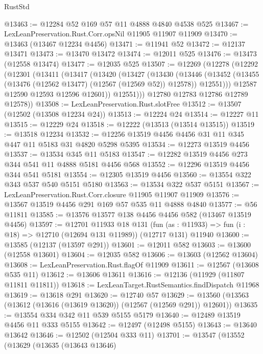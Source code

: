 \begin{lexlean}{RustStd}
\begin{coremodule}
@13463 := @12284 @52 @169 @57 @11 @4888 @4840 @4538 @525
@13467 := LexLeanPreservation.Rust.Corr.opsNil @11905 @11907 @11909
@13470 := @13463 (@13467 @12234 @4456)
@13471 := @11941 @52
@13472 := @12137 @13471
@13473 := @13470 @13472
@13474 := @12011 @525
@13476 := @13473 (@12558 @13474)
@13477 := @12035 @525
@13507 := @12269
    (@12278
      (@12292
        (@12301
          (@13411
            (@13417
              (@13420
                (@13427
                  (@13430
                    (@13446
                      (@13452
                        (@13455 (@13476 (@12562 @13477) (@12567 (@12569 @52)) @12578))
                        @12551)))
                  @12587
                  @12590
                  @12593
                  @12596
                  @12601))
              @12551)))
        @12780
        @12783
        @12786
        @12789
        @12578))
@13508 := LexLeanPreservation.Rust.slotFree
@13512 := @13507 (@12502 (@13508 @12234 @24))
@13513 := @12224 @24
@13514 := @12227 @11
@13515 := @12229 @24
@13518 := @12222 (@13513 (@13514 @13515))
@13519 := @13518 @12234
@13532 := @12256 @13519 @4456 @4456 @31 @11 @345 @447 @11 @5183 @31 @4820 @5298 @5395
@13534 := @12273 @13519 @4456
@13537 := @13534 @345 @11 @5183
@13547 := @12282 @13519 @4456 @273 @344 @541 @11 @4888 @5181 @4456 @568
@13552 := @12296 @13519 @4456 @344 @541 @5181
@13554 := @12305 @13519 @4456
@13560 := @13554 @322 @343 @537 @540 @5151 @5180
@13563 := @13534 @322 @537 @5151
@13567 := LexLeanPreservation.Rust.Corr.closure @11905 @11907 @11909
@13576 := @13567 @13519 @4456 @291 @169 @57 @535 @11 @4888 @4840
@13577 := @56 @11811
@13585 := @13576 @13577 @138 @4456 @4456 @582 (@13467 @13519 @4456)
@13597 := @12701
    @11933
    @18
    @131
    (fun (as : @11933) => fun (i : @18) => @12710 (@12694 @131 @11989))
    (@12717 @131)
    @11940
@13600 := @13585 (@12137 (@13597 @291))
@13601 := @12011 @582
@13603 := @13600 (@12558 @13601)
@13604 := @12035 @582
@13606 := @13603 (@12562 @13604)
@13608 := LexLeanPreservation.Rust.flagOf @11909
@13611 := @12567 (@13608 @535 @11)
@13612 := @13606 @13611
@13616 := @12136 (@11929 (@11807 @11811 @11811))
@13618 := LexLeanTarget.RustSemantics.findDispatch @11968
@13619 := @13618 @291
@13620 := @12740 @57
@13629 := @13560 (@13563 (@13612 (@13616 (@13619 @13620)) (@12567 (@12569 @291)) @12601))
@13635 := @13554 @334 @342 @11 @539 @5155 @5179
@13640 := @12489 @13519 @4456 @11 @333 @5155
@13642 := @12497 (@12498 @5155)
@13643 := @13640 @13642
@13646 := @12502 (@12504 @333 @11)
@13701 := @13547
    (@13552
      (@13629
        (@13635
          (@13643 @13646)

\end{coremodule}
\end{lexlean}
